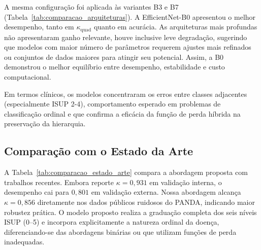 A mesma configuração foi aplicada às variantes B3 e B7 (Tabela~\ref{tab:comparacao_arquiteturas}). A EfficientNet-B0 apresentou o melhor desempenho, tanto em $\kappa_{\text{quad}}$ quanto em acurácia. As arquiteturas mais profundas não apresentaram ganho relevante, houve inclusive leve degradação, sugerindo que modelos com maior número de parâmetros requerem ajustes mais refinados ou conjuntos de dados maiores para atingir seu potencial. Assim, a B0 demonstrou o melhor equilíbrio entre desempenho, estabilidade e custo computacional.

\begin{table}[h]
\centering
{}
\caption{Comparação entre variantes da EfficientNet.}
\label{tab:comparacao_arquiteturas}
\end{table}

Em termos clínicos, os modelos concentraram os erros entre classes adjacentes (especialmente ISUP 2-4), comportamento esperado em problemas de classificação ordinal e que confirma a eficácia da função de perda híbrida na preservação da hierarquia.

\subsection{Comparação com o Estado da Arte}

A Tabela~\ref{tab:comparacao_estado_arte} compara a abordagem proposta com trabalhos recentes. Embora \cite{Xiang2023Prostate} reporte $\kappa=0{,}931$ em validação interna, o desempenho cai para $0{,}801$ em validação externa. Nossa abordagem alcança $\kappa=0{,}856$ diretamente nos dados públicos ruidosos do PANDA, indicando maior robustez prática. O modelo proposto realiza a graduação completa dos seis níveis ISUP (0–5) e incorpora explicitamente a natureza ordinal da doença, diferenciando-se das abordagens binárias ou que utilizam funções de perda inadequadas.

